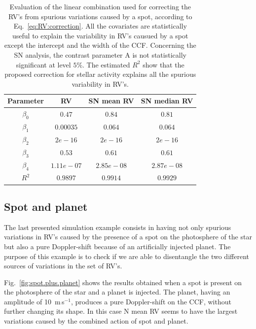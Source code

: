 \documentclass[11pt, oneside]{article}
\def\ms{\hbox{\,m\,s$^{-1}$}}         %
\begin{document}
\begin{table}
\centering
\begin{tabular}{|c|c|c|c|}
\hline
Parameter          & RV         &   SN mean RV &   SN median RV \\
\hline
$\beta_{0}$            &    $0.47$    & $0.84$ & $0.81$ \\
\hline
$\beta_{1}$            &    $0.00035$    & $0.064$ & $0.064$ \\
\hline
$\beta_{2}$            &     $2e-16$   &  $2e-16$ & $2e-16$\\
\hline
$\beta_{3}$            &     $0.53$   &  $0.61$ & $0.61$\\
\hline
$\beta_{4}$            &     $1.11e-07 $   &  $2.85e-08 $ & $ 2.87e-08 $\\
\hline
$R^{2}$      &     $0.9897$    &  $0.9914$ & $0.9929$  \\
\hline
\end{tabular}
\caption{Evaluation of the linear combination used for correcting the RV's from spurious variations caused by a spot, according to Eq.~\ref{eq:RV:correction}. All the covariates are statistically useful to explain the variability in RV's causued by a spot except the intercept and the width of the CCF. Concerning the SN analysis, the contrast parameter A is not statistically significant at level $5\%$. The estimated $R^{2}$ show that the proposed correction for stellar activity explains all the spurious variability in RV's.}
\label{table:spot.test}
\end{table}

\subsection{Spot and planet} \label{sec:soap.spot.planet}

The last presented simulation example consists in having not only spurious variations in RV's caused by the presence of a spot on the photosphere of the star but also a pure Doppler-shift because of an artificially injected planet. The purpose of this example is to check if we are able to disentangle the two different sources of variations in the set of RV's.

Fig.~\ref{fig:spot.plus.planet} shows the results obtained when a spot is present on the photosphere of the star and a planet is injected. The planet, having an amplitude of 10 \ms, produces a pure Doppler-shift on the CCF, without further changing its shape.  In this case N mean RV seems to have the largest variations caused by the combined action of spot and planet. %
\end{document}
